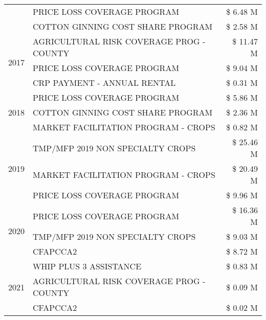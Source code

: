 \begin{tabular}{llr}
 & PRICE LOSS COVERAGE PROGRAM & \$ 6.48 M \\
 & COTTON GINNING COST SHARE PROGRAM & \$ 2.58 M \\
\cline{1-3}
\multirow[t]{3}{*}{2017} & AGRICULTURAL RISK COVERAGE PROG - COUNTY & \$ 11.47 M \\
 & PRICE LOSS COVERAGE PROGRAM & \$ 9.04 M \\
 & CRP PAYMENT - ANNUAL RENTAL & \$ 0.31 M \\
\cline{1-3}
\multirow[t]{3}{*}{2018} & PRICE LOSS COVERAGE PROGRAM & \$ 5.86 M \\
 & COTTON GINNING COST SHARE PROGRAM & \$ 2.36 M \\
 & MARKET FACILITATION PROGRAM - CROPS & \$ 0.82 M \\
\cline{1-3}
\multirow[t]{3}{*}{2019} & TMP/MFP 2019 NON SPECIALTY CROPS & \$ 25.46 M \\
 & MARKET FACILITATION PROGRAM - CROPS & \$ 20.49 M \\
 & PRICE LOSS COVERAGE PROGRAM & \$ 9.96 M \\
\cline{1-3}
\multirow[t]{3}{*}{2020} & PRICE LOSS COVERAGE PROGRAM & \$ 16.36 M \\
 & TMP/MFP 2019 NON SPECIALTY CROPS & \$ 9.03 M \\
 & CFAPCCA2 & \$ 8.72 M \\
\cline{1-3}
\multirow[t]{3}{*}{2021} & WHIP PLUS 3 ASSISTANCE & \$ 0.83 M \\
 & AGRICULTURAL RISK COVERAGE PROG - COUNTY & \$ 0.09 M \\
 & CFAPCCA2 & \$ 0.02 M \\
\cline{1-3}
\bottomrule
\end{tabular}
